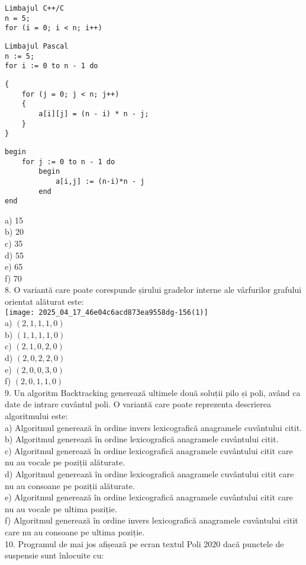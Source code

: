 \begin{verbatim}
Limbajul C++/C
n = 5;
for (i = 0; i < n; i++)
\end{verbatim}

\begin{verbatim}
Limbajul Pascal
n := 5;
for i := 0 to n - 1 do
\end{verbatim}

\begin{verbatim}
{
    for (j = 0; j < n; j++)
    {
        a[i][j] = (n - i) * n - j;
    }
}
\end{verbatim}

\begin{verbatim}
begin
    for j := 0 to n - 1 do
        begin
            a[i,j] := (n-i)*n - j
        end
end
\end{verbatim}

a) 15\\
b) 20\\
c) 35\\
d) 55\\
e) 65\\
f) 70\\
8. O variantă care poate corespunde șirului gradelor interne ale vârfurilor grafului orientat alăturat este:\\
\texttt{[image: 2025\_04\_17\_46e04c6acd873ea9558dg-156(1)]}\\
a) $(2,1,1,1,0)$\\
b) $(1,1,1,1,0)$\\
c) $(2,1,0,2,0)$\\
d) $(2,0,2,2,0)$\\
e) $(2,0,0,3,0)$\\
f) $(2,0,1,1,0)$\\
9. Un algoritm Backtracking generează ultimele două soluții pilo și poli, având ca date de intrare cuvântul poli. O variantă care poate reprezenta descrierea algoritmului este:\\
a) Algoritmul generează în ordine invers lexicografică anagramele cuvântului citit.\\
b) Algoritmul generează în ordine lexicografică anagramele cuvântului citit.\\
c) Algoritmul generează în ordine lexicografică anagramele cuvântului citit care nu au vocale pe poziții alăturate.\\
d) Algoritmul generează în ordine lexicografică anagramele cuvântului citit care nu au consoane pe poziții alăturate.\\
e) Algoritmul generează în ordine lexicografică anagramele cuvântului citit care nu au vocale pe ultima poziție.\\
f) Algoritmul generează în ordine invers lexicografică anagramele cuvântului citit care nu au consoane pe ultima poziție.\\
10. Programul de mai jos afișează pe ecran textul Poli 2020 dacă punctele de suspensie sunt înlocuite cu:

